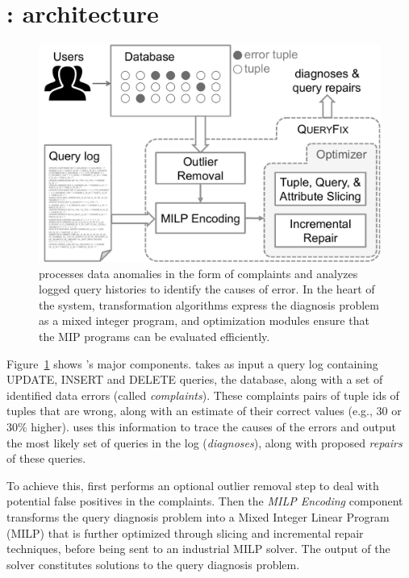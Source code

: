 \section{{\large\textbf{\sys}}: architecture}


\begin{figure}[t]
    \centering
        \includegraphics[scale=0.35]{figures/architecture}
    \caption{\sys processes data anomalies in the form of complaints and analyzes logged query histories to identify the causes of error. In the heart of the system, transformation algorithms express the diagnosis problem as a mixed integer program, and optimization modules ensure that the MIP programs can be evaluated efficiently.}
    \label{fig:architecture}
\end{figure}

Figure~\ref{fig:architecture} shows \sys's major components.  \sys takes as input 
a query log containing UPDATE, INSERT and DELETE queries, the database, along with a
set of identified data errors (called {\it complaints}).  These complaints pairs
of tuple ids of tuples that are wrong, along with an estimate of their correct values (e.g., $30$ or $30\%$ higher).
\sys uses this information to trace the causes of the errors and output the most likely set of 
queries in the log ({\it diagnoses}), along with proposed {\it repairs} of these queries.

To achieve this, \sys first performs an optional outlier removal step to deal with potential
false positives in the complaints.  Then the {\it MILP Encoding} component transforms the
query diagnosis problem into a Mixed Integer Linear Program (MILP) that is further optimized
through slicing and incremental repair techniques, before being sent
to an industrial MILP solver.  The output of the solver constitutes solutions to the query diagnosis
problem.
